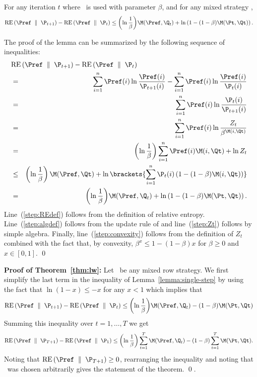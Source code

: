 \begin{lemma} \label{lemma:single-step}
For any iteration $t$ where \lwalg\ is used with parameter $\beta$,
and for any mixed strategy \Pref,
\[
\RE{\Pref}{\P_{t+1}} - \RE{\Pref}{\P_t} 
\leq
\paren{\ln {1 \over \beta}} \M(\Pref,\Q_t) 
+
\ln \left( 1-(1-\beta)\M(\Pt,\Qt) \right).
\]
\end{lemma}
\proof
The proof of the lemma can be summarized by 
the following sequence of inequalities:
\begin{eqnarray}
\lefteqn{
\RE{\Pref}{\P_{t+1}} - \RE{\Pref}{\P_t}} \nonumber \\
&=& 
\sum_{i=1}^n \Pref(i) \ln {\Pref(i) \over \P_{t+1}(i)}
- \sum_{i=1}^n \Pref(i) \ln {\Pref(i) \over \P_t(i)} \label{step:REdef}\\
&=&
\sum_{i=1}^n \Pref(i) \ln {\P_t(i) \over \P_{t+1}(i)}\\
&=&
\sum_{i=1}^n \Pref(i) \ln {Z_t \over \beta^{\M(i,\Qt)}} \label{step:algdef}\\
&=&
\left( \ln {1 \over \beta} \right) \sum_{i=1}^n \Pref(i) \M(i,\Qt)
+ \ln Z_t \label{step:Zt}\\
&\leq&
\left( \ln {1 \over \beta} \right) \M(\Pref,\Qt)
+
\ln\brackets{\sum_{i=1}^n \P_{t}(i) \left( 1- (1-\beta) \M(i,\Qt) \right)}
\label{step:convexity}
\\
&=&
\paren{\ln {1 \over \beta}} \M(\Pref,\Q_t) 
+
\ln \left( 1-(1-\beta)\M(\Pt,\Qt) \right).
\nonumber
\end{eqnarray}
Line~(\ref{step:REdef}) follows from the definition of relative entropy.
Line~(\ref{step:algdef}) follows from the update rule of \lwalg and 
line~(\ref{step:Zt}) follows by simple algebra.
Finally, line~(\ref{step:convexity}) follows from the definition
of $Z_t$ combined with the fact that, by convexity, $\beta^x \leq
1-(1-\beta)x$ for $\beta\geq 0$ and $x\in [0,1]$.
\qed

{\noindent \bf Proof of Theorem~\ref{thm:lw}:} 
Let \Pref\ be any mixed row strategy.
We first simplify the last term in the inequality of
Lemma~\ref{lemma:single-step} by using the fact that 
$\ln(1-x) \leq -x$ for any $x < 1$ which implies that
\[
\RE{\Pref}{\P_{t+1}} - \RE{\Pref}{\P_t} 
\leq
\paren{\ln {1 \over \beta}} \M(\Pref,\Q_t) 
-(1-\beta)\M(\Pt,\Qt)
\]
Summing this inequality over $t=1,\ldots,T$ we get
\[
\RE{\Pref}{\P_{T+1}} - \RE{\Pref}{\P_1}
\leq
\paren{\ln {1 \over \beta}} \sum_{t=1}^T \M(\Pref,\Q_t) 
-(1-\beta) \sum_{t=1}^T \M(\Pt,\Qt).
\]
Noting that $\RE{\Pref}{\P_{T+1}} \geq 0$, rearranging the
inequality and noting that \Pref\ was chosen arbitrarily gives the
statement of the theorem.
\qed.

